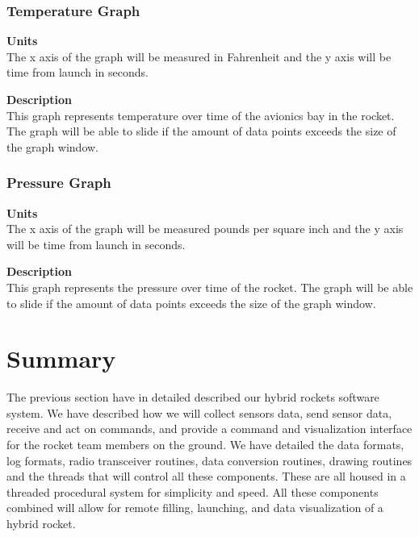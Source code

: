 \documentclass[10pt,draftclsnofoot,onecolumn,compsoc]{IEEEtran}
\begin{document}
\subsubsection{Temperature Graph}
{\bf Units} \\ The x axis of the graph will be measured in Fahrenheit and the y axis will be time from launch in seconds.\par
{\bf Description} \\ This graph represents temperature over time of the avionics bay in the rocket. The graph will be able to slide if the amount of data points exceeds the size of the graph window. \par

\subsubsection{Pressure Graph}
{\bf Units} \\ The x axis of the graph will be measured pounds per square inch and the y axis will be time from launch in seconds.\par
{\bf Description} \\ This graph represents the pressure over time of the rocket. The graph will be able to slide if the amount of data points exceeds the size of the graph window. \par


\section{Summary}
The previous section have in detailed described our hybrid rockets software system. We have described how we will collect sensors data, send sensor data, receive and act on commands, and provide  a command and visualization interface for the rocket team members on the ground. We have detailed the data formats, log formats, radio transceiver routines, data conversion routines, drawing routines and the threads that will control all these components. These are all housed in a threaded procedural system for simplicity and speed. All these components combined will allow for remote filling, launching, and data visualization of a hybrid rocket. \par

\newpage
\end{document}
